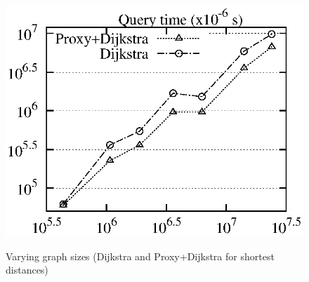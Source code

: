 \begin{figure}[tb!]
\begin{center}
{\includegraphics[scale=0.422]{./exp/query_q7_dist_dj.eps}}
\end{center}
\vspace{-0.5ex}
\caption{Varying graph sizes (Dijkstra and Proxy+Dijkstra for shortest distances)}
\label{fig:performance_dist_graph_size_dj}
\vspace{-1ex}
\end{figure}

